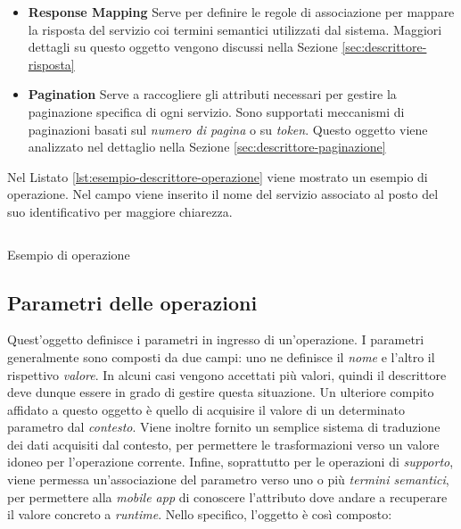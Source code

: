 \begin{itemize}
	\item \textbf{Response Mapping}
	Serve per definire le regole di associazione per mappare la risposta del servizio coi termini semantici utilizzati dal sistema. Maggiori dettagli su questo oggetto vengono discussi nella Sezione \ref{sec:descrittore-risposta}
	\item \textbf{Pagination}
	Serve a raccogliere gli attributi necessari per gestire la paginazione specifica di ogni servizio. Sono supportati meccanismi di paginazioni basati sul \emph{numero di pagina} o su \emph{token}. Questo oggetto viene analizzato nel dettaglio nella Sezione \ref{sec:descrittore-paginazione}
\end{itemize}

Nel Listato \ref{lst:esempio-descrittore-operazione} viene mostrato un esempio di operazione. Nel campo  viene inserito il nome del servizio associato al posto del suo identificativo per maggiore chiarezza.

\begin{listing}[h]
	\inputminted{json}{5-implementazione-backend/Codice/esempio_descrittore_operazione.json}
	\caption{Esempio di operazione}
	\label{lst:esempio-descrittore-operazione}
\end{listing}

\subsection{Parametri delle operazioni\label{sec:descrittore-parametri}}

Quest'oggetto definisce i parametri in ingresso di un'operazione. I parametri generalmente sono composti da due campi: uno ne definisce il \emph{nome} e l'altro il rispettivo \emph{valore}. In alcuni casi vengono accettati più valori, quindi il descrittore deve dunque essere in grado di gestire questa situazione. Un ulteriore compito affidato a questo oggetto è quello di acquisire il valore di un determinato parametro dal \emph{contesto}. Viene inoltre fornito un semplice sistema di traduzione dei dati acquisiti dal contesto, per permettere le trasformazioni verso un valore idoneo per l'operazione corrente. Infine, soprattutto per le operazioni di \emph{supporto}, viene permessa un'associazione del parametro verso uno o più \emph{termini semantici}, per permettere alla \emph{mobile app} di conoscere l'attributo dove andare a recuperare il valore concreto a \emph{runtime}. Nello specifico, l'oggetto è così composto:

